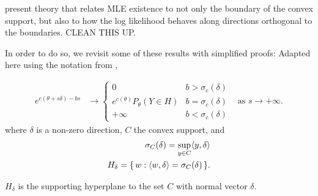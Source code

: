 \citet{Geyer:1990,Geyer:gdor} present theory that relates MLE existence to not only
the boundary of the convex support, but also to how the log likelihood behaves along
directions orthogonal to the boundaries.
CLEAN THIS UP.

In order to do so, we revisit some of these results with simplified proofs:
Adapted here using the notation from \citep{Geyer:gdor},
\begin{theorem}
\begin{align*}
e^{c(\theta + s \delta) - bs} &\to 
		\begin{cases} 
			0 								& b > \sigma_c(\delta) \\
			e^{c(\theta)} P_\theta(Y \in H ) 	& b = \sigma_c(\delta) \\
			+\infty							& b < \sigma_c(\delta)
		\end{cases}
& \text{as } s \to +\infty.
\end{align*}
where $\delta$ is a non-zero direction, $C$ the convex support, and
\begin{align*}
	\sigma_C (\delta) = \sup_{y \in C} \langle  y, \delta \rangle \\
	H_\delta = \{\, w: \langle w, \delta \rangle = \sigma_C(\delta)  \,\}.
\end{align*}
\end{theorem}
$H_\delta$ is the supporting hyperplane to the set $C$ with normal vector $\delta$.

